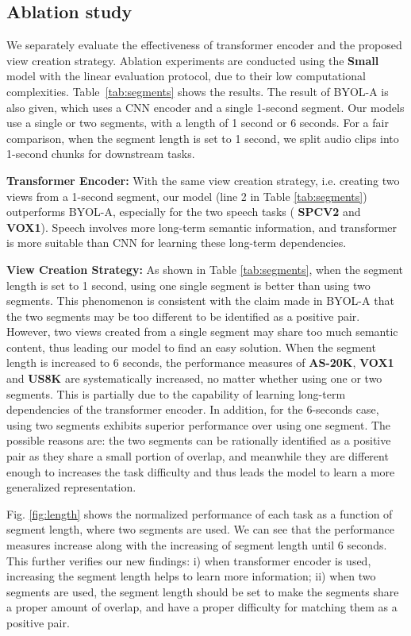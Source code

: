 \subsection{Ablation study}
\label{sec:ablation}
 We separately evaluate the effectiveness of transformer encoder and the proposed view creation strategy. Ablation experiments are conducted using the \textbf{Small} model with the linear evaluation protocol, due to their low computational complexities. Table~\ref{tab:segments} shows the results. The result of BYOL-A is also given, which uses a CNN encoder and a single 1-second segment. Our models use a single or two segments, with a length of 1 second or 6 seconds. For a fair comparison, when the segment length is set to 1 second, we split audio clips into 1-second chunks for downstream tasks.
 
 \textbf{Transformer Encoder:} With the same view creation strategy, i.e. creating two views from a 1-second segment, our model (line 2 in Table \ref{tab:segments}) outperforms BYOL-A, especially for the two speech tasks ( \textbf{SPCV2} and \textbf{VOX1}). Speech involves more long-term semantic information, and transformer is more suitable than CNN for learning these long-term dependencies.
 
 \textbf{View Creation Strategy:} As shown in Table \ref{tab:segments}, when the segment length is set to 1 second, using one single segment is better than using two segments. This phenomenon is consistent with the claim made in BYOL-A \cite{niizumi_byol_2021} that the two segments may be too different to be identified as a positive pair. However, two views created from a single segment may share too much semantic content, thus leading our model to find an easy solution. 
When the segment length is increased to 6 seconds, the performance measures of \textbf{AS-20K}, \textbf{VOX1} and \textbf{US8K} are systematically increased, no matter whether using one or two segments. This is partially due to the capability of learning long-term dependencies of the transformer encoder.
In addition, for the 6-seconds case, using two segments exhibits superior performance over using one segment. The possible reasons are: the two segments can be rationally identified as a positive pair as they share a small portion of overlap, and meanwhile they are different enough to increases the task difficulty and thus leads the model to learn a more generalized representation.  




Fig. \ref{fig:length} shows the normalized performance of each task as a function of segment length, where two segments are used. We can see that the performance measures increase along with the increasing of segment length until 6 seconds. This further verifies our new findings: i) when transformer encoder is used, increasing the segment length helps to learn more information; ii) when two segments are used, the segment length should be set
to make the segments share a proper amount of overlap, and have a proper difficulty for matching them as a positive pair.





